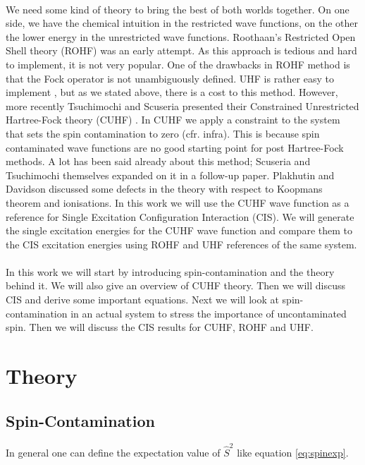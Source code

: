 \documentclass[twoside,twocolumn,9pt]{article}
\begin{document}
\paragraph*{}
We need some kind of theory to bring the best of both worlds together. On one side, we have the chemical intuition in the restricted wave functions, on the other the lower
energy in the unrestricted wave functions. Roothaan's Restricted Open Shell theory (ROHF)\cite{Roothaan1960} was an early attempt. As this approach is tedious and hard to implement,
it is not very popular\cite{Scuseria2010, Bally2008}. One of the drawbacks in ROHF method is that the Fock operator is not unambiguously defined\cite{Scuseria2010, Plakhutin2014}.
UHF is rather easy to implement \cite{Scuseria2010, Bally2008}, but as we stated above, there is a cost to this method.
However, more recently Tsuchimochi and Scuseria presented their Constrained Unrestricted Hartree-Fock theory (CUHF)
\cite{Scuseria2010}. In CUHF we apply a constraint to the system that sets the spin contamination to zero (cfr. infra). This is because spin contaminated wave functions are no
good starting point for post Hartree-Fock methods\cite{Scuseria2010}. A lot has been said
already about this method; Scuseria and Tsuchimochi themselves expanded on it in a follow-up paper\cite{Scuseria2011}. Plakhutin and Davidson discussed some defects in the theory
with respect to
Koopmans theorem and ionisations\cite{Plakhutin2014}. In this work we will use the CUHF wave function as a reference for
Single Excitation Configuration Interaction (CIS). We will generate the single excitation energies for the CUHF wave function and compare them to the CIS excitation energies using
ROHF and UHF references of the same system.
\paragraph*{}
In this work we will start by introducing spin-contamination and the theory behind it. We will also give an overview of CUHF theory. Then we will discuss CIS and derive some important
equations. Next we will look at spin-contamination in an actual system to stress the importance of uncontaminated spin. Then we will discuss the CIS results for CUHF, ROHF and UHF.
\section{Theory}
\subsection{Spin-Contamination}
\label{subsec:spinconttheory}
In general one can define the expectation value of $\hat{S}^2$ like equation \eqref{eq:spinexp}\cite{Andrews1991}.
\end{document}
